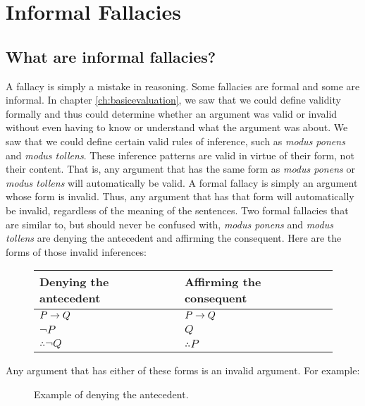 \chapter{Informal Fallacies}
\label{ch:informalfallacies}
\setlength{\parindent}{1em}

\section{What are informal fallacies?}

A fallacy is simply a mistake in reasoning. Some fallacies are formal and some are informal. In chapter \ref{ch:basicevaluation}, we saw that we could define validity formally and thus could determine whether an argument was valid or invalid without even having to know or understand what the argument was about. We saw that we could define certain valid rules of inference, such as \textit{modus ponens} and \textit{modus tollens}. These inference patterns are valid in virtue of their form, not their content. That is, any argument that has the same form as \textit{modus ponens} or \textit{modus tollens} will automatically be valid. A formal fallacy is simply an argument whose form is invalid. Thus, any argument that has that form will automatically be invalid, regardless of the meaning of the sentences. Two formal fallacies that are similar to, but should never be confused with, \textit{modus ponens} and \textit{modus tollens} are denying the antecedent and affirming the consequent. Here are the forms of those invalid inferences:

\begin{figure}[!ht]
\begin{tabu}{X[1 l] X[1 l]}
\textbf{Denying the antecedent} & \textbf{Affirming the consequent} \\ \midrule
$P \mathrel{\rightarrow} Q$        & $P \mathrel{\rightarrow} Q$ \\
$\lnot P$            & $Q$ \\
$\therefore \lnot Q$ & $\therefore P$ \\
\end{tabu}
\end{figure}

Any argument that has either of these forms is an invalid argument. For example:
\begin{figure}[!ht]
\begin{kormanize}
\end{kormanize}
\label{arg:kant_invalid}
\caption{Example of denying the antecedent.}
\end{figure}

